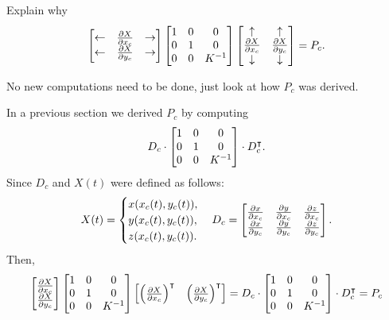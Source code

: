\documentclass[newpage,hints,handout]{ximera}
\begin{document}
\begin{problem}
  Explain why
  \[
\begin{bmatrix}
    \leftarrow & \pp[X]{x_c} & \rightarrow \\
    \leftarrow & \pp[X]{y_c} & \rightarrow
  \end{bmatrix}
  \begin{bmatrix}
    1 & 0 & 0\\
    0 & 1 & 0\\
    0 & 0 & K^{-1}
  \end{bmatrix}
  \begin{bmatrix}
    \uparrow & \uparrow \\
    \pp[X]{x_c} & \pp[X]{y_c} \\
    \downarrow & \downarrow
  \end{bmatrix} =P_c.
  \]
  \begin{hint}
    No new computations need to be done, just look at how $P_c$ was derived.
  \end{hint}
  \begin{freeResponse}
  In a previous section we derived $P_c$ by computing
  \[
  D_c \cdot 
  \begin{bmatrix}
    1 & 0 & 0\\
    0 & 1 & 0\\
    0 & 0 & K^{-1}
  \end{bmatrix} \cdot D_c^\transpose.
  \]
  Since $D_c$ and $X\left(t\right)$ were defined as follows:
  \[
X(t) = 
\begin{cases}
  x(x_c(t),y_c(t)),\\
  y(x_c(t),y_c(t)),\\
  z(x_c(t),y_c(t)).
\end{cases} \\
 D_c =
  \begin{bmatrix}
    \pp[x]{x_c} & \pp[y]{x_c} & \pp[z]{x_c} \\
    \pp[x]{y_c}   & \pp[y]{y_c}   & \pp[z]{y_c}
  \end{bmatrix}.
\]
Then, 
\[
 \begin{bmatrix}
    \pp[X]{x_c}\\
    \pp[X]{y_c}
  \end{bmatrix}
  \begin{bmatrix}
    1 & 0 & 0\\
    0 & 1 & 0\\
    0 & 0 & K^{-1}
  \end{bmatrix}
  \begin{bmatrix}
    \left(\pp[X]{x_c}\right)^\transpose & \left(\pp[X]{y_c}\right)^\transpose
  \end{bmatrix}
  = D_c \cdot 
  \begin{bmatrix}
    1 & 0 & 0\\
    0 & 1 & 0\\
    0 & 0 & K^{-1}
  \end{bmatrix} \cdot D_c^\transpose
  = P_c
\]
  \end{freeResponse}
\end{problem}
\end{document}

